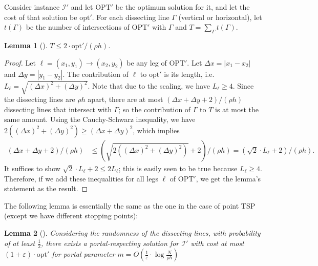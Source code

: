 \documentclass[pdflatex,sn-mathphys-num]{sn-jnl}
\theoremstyle{thmstyleone}
\newtheorem{lemma}{Lemma}
\newcommand{\eps}{\varepsilon}
\newcommand{\opt}{{\text{opt}}}
\newcommand{\OPT}{{\text{OPT}}}
\newcommand{\abs}[1]{\left.|#1|\right.}
\begin{document}
Consider instance $\mathcal I'$ and let $\OPT'$ be the optimum solution for it, and let the cost of that solution be $\opt'$. For each dissecting line $\Gamma$ (vertical or horizontal), let $t(\Gamma)$ be the number of intersections of $\OPT'$ with $\Gamma$ and $T = \sum_\Gamma t(\Gamma)$. 
\begin{lemma}[\cite{Arora98}]\label{lemma:T-less-2opt}
    $T\le 2\cdot\opt'/(\rho h)$.
\end{lemma}
\begin{proof}
    Let $\ell = (x_1, y_1)\to (x_2, y_2)$ be any leg of $\OPT'$. Let $\Delta x = \abs{x_1 - x_2}$ and $\Delta y = \abs{y_1 - y_2}$. The contribution of $\ell$ to $\opt'$ is its length, i.e. $L_\ell = \sqrt{(\Delta x)^2 + (\Delta y)^2}$. Note that due to the scaling, we have $L_\ell \ge 4$. Since the dissecting lines are $\rho h$ apart, there are at most $(\Delta x + \Delta y + 2)/(\rho h)$ dissecting lines that intersect with $\Gamma$; so the contribution of $\Gamma$ to $T$ is at most the same amount. Using the Cauchy-Schwarz inequality, we have
    $2((\Delta x)^2 + (\Delta y)^2)\ge (\Delta x + \Delta y)^2$, which implies
    \begin{align*}
        (\Delta x + \Delta y + 2)/(\rho h) &\le (\sqrt{2((\Delta x)^2 + (\Delta y)^2)} + 2 )/(\rho h)= (\sqrt 2\cdot L_\ell + 2)/(\rho h).
    \end{align*}
    It suffices to show $ \sqrt 2\cdot L_\ell + 2 \le 2L_\ell$; this is easily seen to be true because $L_\ell \ge 4$. Therefore, if we add these inequalities for all legs $\ell$ of $\OPT'$, we get the lemma's statement as the result.
\end{proof}

The following lemma is essentially the same as the one in the  case of point TSP (except we have different stopping points):
\begin{lemma}[\cite{Arora98}]\label{lemma:portal-respecting}
    Considering the randomness of the dissecting lines, with probability of at least $\frac12$, there exists a portal-respecting solution for $\mathcal I'$ with cost at most $(1 + \eps)\cdot \opt'$ for portal parameter $m = O(\frac{1}\eps\cdot \log \frac N{\rho h})$
\end{lemma}
\end{document}
